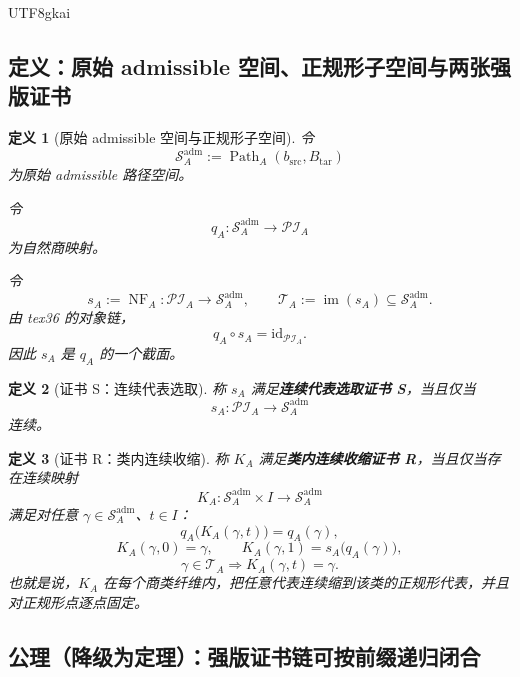 \documentclass[12pt]{article}
\newtheorem{definition}{定义}[section]
\newcommand{\id}{\mathrm{id}}
\begin{document}
\begin{CJK*}{UTF8}{gkai}
\subsection{定义：原始 admissible 空间、正规形子空间与两张强版证书}
\label{subsec:tex1-ch8-defs}

\begin{definition}[原始 admissible 空间与正规形子空间]
\label{def:tex1-ch8-objects}
令
\[
  \mathcal S_A^{\mathrm{adm}}
  :=
  \operatorname{Path}_A(b_{\mathrm{src}},B_{\mathrm{tar}})
\]
为原始 admissible 路径空间。

令
\[
  q_A:\mathcal S_A^{\mathrm{adm}}\to \mathcal{PI}_A
\]
为自然商映射。

令
\[
  s_A:=\operatorname{NF}_A:\mathcal{PI}_A\to \mathcal S_A^{\mathrm{adm}},
  \qquad
  \mathcal T_A:=\operatorname{im}(s_A)\subseteq \mathcal S_A^{\mathrm{adm}}.
\]
由 tex36 的对象链，
\[
  q_A\circ s_A=\id_{\mathcal{PI}_A}.
\]
因此 \(s_A\) 是 \(q_A\) 的一个截面。
\end{definition}

\begin{definition}[证书 S：连续代表选取]
\label{def:tex1-ch8-cert-s}
称 \(s_A\) 满足\textbf{连续代表选取证书 S}，当且仅当
\[
  s_A:\mathcal{PI}_A\to \mathcal S_A^{\mathrm{adm}}
\]
连续。
\end{definition}

\begin{definition}[证书 R：类内连续收缩]
\label{def:tex1-ch8-cert-r}
称 \(K_A\) 满足\textbf{类内连续收缩证书 R}，当且仅当存在连续映射
\[
  K_A:\mathcal S_A^{\mathrm{adm}}\times I\to \mathcal S_A^{\mathrm{adm}}
\]
满足对任意 \(\gamma\in \mathcal S_A^{\mathrm{adm}}\)、\(t\in I\)：
\[
  q_A\bigl(K_A(\gamma,t)\bigr)=q_A(\gamma),
\]
\[
  K_A(\gamma,0)=\gamma,
  \qquad
  K_A(\gamma,1)=s_A\bigl(q_A(\gamma)\bigr),
\]
\[
  \gamma\in \mathcal T_A
  \Longrightarrow
  K_A(\gamma,t)=\gamma.
\]
也就是说，\(K_A\) 在每个商类纤维内，把任意代表连续缩到该类的正规形代表，并且对正规形点逐点固定。
\end{definition}

\subsection{公理（降级为定理）：强版证书链可按前缀递归闭合}
\label{subsec:tex1-ch8-axiom}


\end{CJK*}
\end{document}
